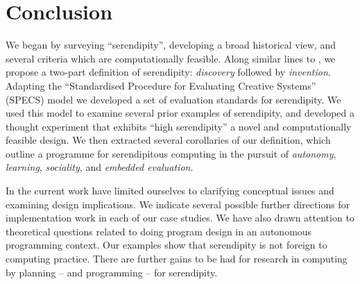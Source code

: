 \section{Conclusion} \label{sec:conclusion}

%
We began by surveying ``serendipity'', developing a broad historical
view, and several criteria which are computationally feasible.  Along
similar lines to , we propose a two-part
definition of serendipity: \emph{discovery} followed by
\emph{invention}.
%
Adapting the ``Standardised Procedure for Evaluating Creative
Systems'' (SPECS) model we developed a set of evaluation standards for
serendipity.
%
We used this model to examine several prior examples of serendipity,
and developed a thought experiment that exhibits ``high serendipity''
a novel and computationally feasible design.
%
We then extracted several corollaries of our definition, which outline
a programme for serendipitous computing in the pursuit of
\emph{autonomy}, \emph{learning}, \emph{sociality}, and \emph{embedded
  evaluation}.

In the current work have limited ourselves to clarifying conceptual
issues and examining design implications.
% 
We indicate several possible further directions for implementation
work in each of our case studies.  We have also drawn attention to
theoretical questions related to doing program design in an autonomous
programming context.  Our examples show that serendipity is not
foreign to computing practice.  There are further gains to be had for
research in computing by planning -- and programming -- for
serendipity.
%

